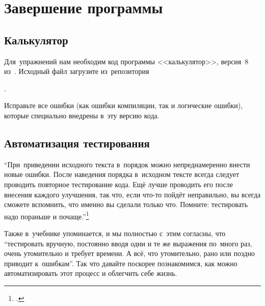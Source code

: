 
\chapter{Завершение программы}\label{chap:completingprog}

\section{Калькулятор}
Для~упражнений нам необходим код программы <<калькулятор>>, версия~8 из~. Исходный файл загрузите из~репозитория
\begin{center}
    .
\end{center}

Исправьте все ошибки (как ошибки компиляции, так и логические ошибки), которые специально внедрены в~эту версию кода.



\section{Автоматизация тестирования}
\enquote{При~приведении исходного текста в~порядок можно непреднамеренно внести новые ошибки. После наведения порядка в~исходном тексте всегда следует проводить повторное тестирование кода. Ещё лучше проводить его после внесения каждого улучшения, так что, если что-то пойдёт неправильно, вы всегда сможете вспомнить, что именно вы сделали только что. Помните: тестировать надо пораньше и почаще.}\footcite[глава~7, страница~282, последний абзац]{Stroustrup:2016:ru}

Также в~учебнике упоминается, и мы полностью с~этим согласны, что \enquote{тестировать вручную, постоянно вводя одни и те же выражения по~много раз, очень утомительно и требует времени. А всё, что утомительно, рано или поздно приводит к~ошибкам}. Так что давайте поскорее познакомимся, как можно автоматизировать этот процесс и облегчить себе жизнь.



